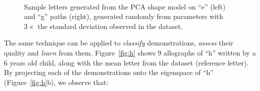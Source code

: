 \documentclass{article}
\begin{document}
\begin{figure}[thpb]
\centering
{}
~~~~~
\caption{\small \label{fig:sampleLetters}Sample letters generated from the PCA shape
model on ``e'' (left) and ``g'' paths (right), generated randomly from
parameters with $3\times$ the standard deviation observed in the dataset.}

\end{figure}

The same technique can be applied to \emph{classify} demonstrations,
\emph{assess} their quality and
\emph{learn} from them. Figure~\ref{fig:h} shows 9 allographs of ``h'' written by a 6
years old child, along with the mean letter from the
dataset (reference letter). By projecting each of the demonstrations onto the eigenspace
of ``h'' (Figure~\ref{fig:h}b), we observe that:
\end{document}
